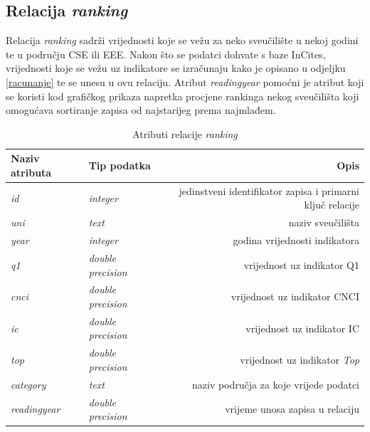 \documentclass[times, utf8, zavrsni]{fer}
\begin{document}
\subsection{Relacija \emph{ranking}}
Relacija \emph{ranking} sadrži vrijednosti koje se vežu za neko sveučilište u nekoj godini te u području CSE ili EEE. 
Nakon što se podatci dohvate s baze InCites, vrijednosti koje se vežu uz indikatore se izračunaju kako je opisano u odjeljku \ref{racunanje} 
te se unesu u ovu relaciju. Atribut \emph{readingyear} pomoćni je atribut koji se koristi kod grafičkog prikaza napretka procjene rankinga 
nekog sveučilišta koji omogućava sortiranje zapisa od najstarijeg prema najmlađem.
\begin{table}[htb]
    \caption{Atributi relacije \emph{ranking}}
        \label{tbl:ranking}
        \centering
        \begin{tabular}{llr} \hline
        Naziv atributa & Tip podatka & Opis\\ \hline
        \emph{id} &  \emph{integer} & jedinstveni identifikator zapisa i primarni ključ relacije\\
        \emph{uni} &  \emph{text} & naziv sveučilišta\\
        \emph{year} &  \emph{integer} & godina vrijednosti indikatora\\
        \emph{q1} &  \emph{double precision} & vrijednost uz indikator Q1\\
        \emph{cnci} &  \emph{double precision} & vrijednost uz indikator CNCI\\
        \emph{ic} &  \emph{double precision} & vrijednost uz indikator IC\\
        \emph{top} &  \emph{double precision} & vrijednost uz indikator \emph{Top}\\
        \emph{category} &  \emph{text} & naziv područja za koje vrijede podatci\\
        \emph{readingyear} &  \emph{double precision} & vrijeme unosa zapisa u relaciju\\
        \end{tabular}
        \end{table}    
        \FloatBarrier 
\end{document}
